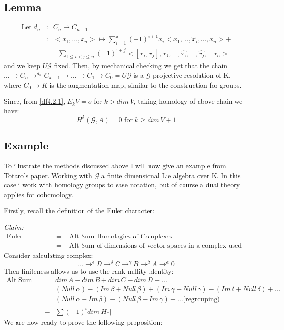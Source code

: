 \subsection{Lemma}\label{4.2.3}
\begin{eqnarray}
\nonumber \text{Let }d_n &:& C_n\mapsto C_{n-1}\\
\nonumber                &:& <x_1,\dots ,x_n>\mapsto
\sum_{i=1}^n{(-1)}^{i+1} x_i<x_1,\dots ,\widehat x_i, \dots , x_n>
+\\
\nonumber               &&\,\,\,\, \sum_{1\leq i<j\leq n}
{(-1)}^{i+j} <[x_i,x_j],x_1,\dots , \widehat {x_i},\dots
,\widehat{x_j}, \dots x_n >
\end{eqnarray}
and we keep $U\mathcal G$ fixed. Then, by mechanical checking we
get that the chain $\dots \rightarrow C_n \rightarrow ^{d_n}
C_{n-1}\rightarrow \dots \rightarrow C_1\rightarrow C_0 =
U\mathcal G$ is a $\mathcal G$-projective resolution of K, where
$C_0\rightarrow K$ is the augmentation map, similar to the
construction for groups.

Since, from \ref{df4.2.1}, $E_kV=o$ for $k>dim\,V$, taking homology
of above chain we have:
$$H^k(\mathcal G,A) = 0 \text{ for } k\geq dim\,V +1$$

\subsection{Example}\label{df4.2.4}
To illustrate the methods discussed above I will now give an
example from Totaro's paper. Working with $\mathcal G$ a finite
dimensional Lie algebra over K. In this case i work with homology
groups to ease notation, but of course a dual theory applies for
cohomology.

Firstly, recall the definition of the Euler character:

\emph{Claim:
\begin{eqnarray}
\nonumber\text{Euler Character }&=&\text{ Alt Sum Homologies of Complexes}\\
\nonumber                       &=&\text{ Alt Sum of dimensions of vector spaces in a complex used to calculate Homology}
\end{eqnarray}}
Consider calculating complex:
$$\dots \rightarrow^\epsilon D\rightarrow^\delta
C\rightarrow^\gamma B\rightarrow ^\beta A\rightarrow ^\alpha 0$$
Then finiteness allows us to use the rank-nullity identity:
\begin{eqnarray}
\nonumber \text{Alt Sum dimensions} &=&
dim\,A-dim\,B+dim\,C-dim\,D+\dots\\
\nonumber &=& (Null\,\alpha)-(Im\,\beta
+Null\,\beta)+(Im\,\gamma+Null\,\gamma)-(Im\,\delta
+Null\,\delta)+\dots\\
\nonumber &=& (Null\,\alpha -Im\,\beta)-(Null\,\beta -Im\,\gamma)+\dots\text{(regrouping)}\\
\nonumber &=& \sum {(-1)}^i dim|H_*|
\end{eqnarray}
We are now ready to prove the following proposition:
